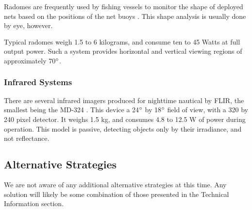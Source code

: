 Radomes are frequently used by fishing vessels to monitor the shape of deployed nets based on the positions of the net buoys \cite{furuno__marine-radar-guide}. This shape analysis is usually done by eye, however.

Typical radomes weigh 1.5 to 6 kilograms, and consume ten to 45 Watts at full output power. Such a system provides horizontal and vertical viewing regions of approximately 70$\degree$.

\subsubsection{\label{sec:intro:commercial:ir}Infrared Systems}
There are several infrared imagers produced for nighttime nautical by FLIR, the smallest being the MD-324 \cite{flir-md324}. This device a 24$\degree$ by 18$\degree$ field of view, with a 320 by 240 pixel detector. It weighs 1.5 kg, and consumes 4.8 to 12.5 W of power during operation. This model is passive, detecting objects only by their irradiance, and not reflectance.

\subsection{\label{sec:intro:alternatives}Alternative Strategies}
We are not aware of any additional alternative strategies at this time. Any solution will likely be some combination of those presented in the Technical Information section.
